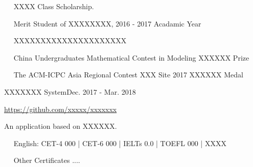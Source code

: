 \documentclass{sorahjy_cv}
\begin{document}
%
%

\begin{description}{}
	\item{\ \ } XXXX Class Scholarship.
	\item{\ \ } Merit Student of XXXXXXXX, 2016 - 2017 Acadamic Year
	\item{\ \ } XXXXXXXXXXXXXXXXXXXXX
	\item{\ \ } China Undergraduates Mathematical Contest in Modeling {\color{orangeRed}XXXXXX Prize}
	\item{\ \ } The ACM-ICPC Asia Regional Contest XXX Site 2017 {\color{orangeRed}XXXXXX Medal}
\end{description}


%
%


\begin{sectionContentSimple}{XXXXXXX System}{Dec. 2017 - Mar. 2018}
	\item \url{https://github.com/xxxxx/xxxxxxx}
	\item An application based on XXXXXX.
\end{sectionContentSimple}


%
%



%
%

\begin{description}{}
	\item{\ \ } English: CET-4 000 | CET-6 000 | IELTs 0.0 | TOEFL 000 | XXXX
	\item{\ \ } Other Certificates ....
\end{description}





\end{document}

